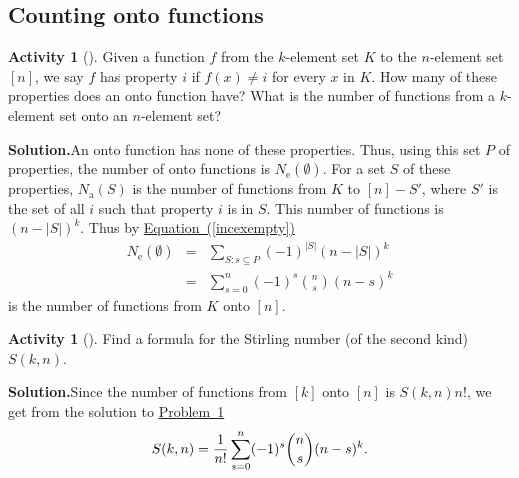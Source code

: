 \documentclass[10pt,]{book}
\theoremstyle{plain}
\theoremstyle{definition}
\newtheorem{activity}[project]{Activity}
\numberwithin{equation}{chapter}
\newcommand{\amp}{&}
\begin{document}
\subsection[{Counting onto functions}]{Counting onto functions}\label{subsection-38}
\begin{activity}[]\label{numontofun}
Given a function \(f\) from the \(k\)-element set \(K\) to the \(n\)-element set \([n]\), we say \(f\) has property \(i\) if \(f(x)\not= i\) for every \(x\) in \(K\). How many of these properties does an onto function have? What is the number of functions from a \(k\)-element set onto an \(n\)-element set?%
\par\medskip\noindent%
\textbf{Solution.}\quad An onto function has none of these properties. Thus, using this set \(P\) of properties, the number of onto functions is \(N_{\mbox{e} }(\emptyset)\). For a set \(S\) of these properties, \(N_{\mbox{a} }(S)\) is the number of functions from \(K\) to \([n]-S'\), where \(S'\) is the set of all \(i\) such that property \(i\) is in \(S\). This number of functions is \((n-|S|)^k\). Thus by \hyperref[incexempty]{Equation~(\ref{incexempty})}%
\begin{align*}
N_{\mbox{e} }(\emptyset) \amp =\amp  \sum_{S:s\subseteq P} (-1)^{|S|}
(n-|S|)^k\\
\amp =\amp \sum_{s=0}^n (-1)^s{n\choose s}(n-s)^k
\end{align*}
is the number of functions from \(K\) onto \([n]\).%
\end{activity}
\begin{activity}[]\label{activity-112}
Find a formula for the Stirling number (of the second kind) \(S(k,n)\).%
\par\medskip\noindent%
\textbf{Solution.}\quad Since the number of functions from \([k]\) onto \([n]\) is \(S(k,n)n!\), we get from the solution to \hyperref[numontofun]{Problem~\ref{numontofun}}%
\begin{equation*}
S(k,n) = {1\over n!}\sum_{s=0}^n (-1)^s{n\choose s}(n-s)^k.
\end{equation*}
%
\end{activity}
\typeout{************************************************}
\typeout{************************************************}
\end{document}
